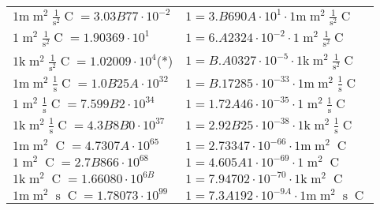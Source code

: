 \begin{center}
\begin{longtable}{l l}
{\color{gray}$1 \bm{\mathrm{ m}}{\operatorname{m}^2}\frac1{\operatorname{s}^2}{\operatorname{C}}{} = 3.03B77\cdot10^{-2} $}   & {\color{gray}$ 1 = 3.B690A\cdot10^{1} \cdot 1 \bm{\mathrm{ m}}{\operatorname{m}^2}\frac1{\operatorname{s}^2}{\operatorname{C}}{}$}  \\
{\color{black}$1 \bm{\mathrm{ }}{\operatorname{m}^2}\frac1{\operatorname{s}^2}{\operatorname{C}}{} = 1.90369\cdot10^{1} $}   & {\color{black}$ 1 = 6.A2324\cdot10^{-2} \cdot 1 \bm{\mathrm{ }}{\operatorname{m}^2}\frac1{\operatorname{s}^2}{\operatorname{C}}{}$}  \\
{\color{gray}$1 \bm{\mathrm{ k}}{\operatorname{m}^2}\frac1{\operatorname{s}^2}{\operatorname{C}}{} = 1.02009\cdot10^{4} $}\quad(*) & {\color{gray}$ 1 = B.A0327\cdot10^{-5} \cdot 1 \bm{\mathrm{ k}}{\operatorname{m}^2}\frac1{\operatorname{s}^2}{\operatorname{C}}{}$}  \\
{\color{gray}$1 \bm{\mathrm{ m}}{\operatorname{m}^2}\frac1{\operatorname{s}}{\operatorname{C}}{} = 1.0B25A\cdot10^{32} $}   & {\color{gray}$ 1 = B.17285\cdot10^{-33} \cdot 1 \bm{\mathrm{ m}}{\operatorname{m}^2}\frac1{\operatorname{s}}{\operatorname{C}}{}$}  \\
{\color{black}$1 \bm{\mathrm{ }}{\operatorname{m}^2}\frac1{\operatorname{s}}{\operatorname{C}}{} = 7.599B2\cdot10^{34} $}   & {\color{black}$ 1 = 1.72A46\cdot10^{-35} \cdot 1 \bm{\mathrm{ }}{\operatorname{m}^2}\frac1{\operatorname{s}}{\operatorname{C}}{}$}  \\
{\color{gray}$1 \bm{\mathrm{ k}}{\operatorname{m}^2}\frac1{\operatorname{s}}{\operatorname{C}}{} = 4.3B8B0\cdot10^{37} $}   & {\color{gray}$ 1 = 2.92B25\cdot10^{-38} \cdot 1 \bm{\mathrm{ k}}{\operatorname{m}^2}\frac1{\operatorname{s}}{\operatorname{C}}{}$}  \\
{\color{gray}$1 \bm{\mathrm{ m}}{\operatorname{m}^2}{}{\operatorname{C}}{} = 4.7307A\cdot10^{65} $}   & {\color{gray}$ 1 = 2.73347\cdot10^{-66} \cdot 1 \bm{\mathrm{ m}}{\operatorname{m}^2}{}{\operatorname{C}}{}$}  \\
{\color{black}$1 \bm{\mathrm{ }}{\operatorname{m}^2}{}{\operatorname{C}}{} = 2.7B866\cdot10^{68} $}   & {\color{black}$ 1 = 4.605A1\cdot10^{-69} \cdot 1 \bm{\mathrm{ }}{\operatorname{m}^2}{}{\operatorname{C}}{}$}  \\
{\color{gray}$1 \bm{\mathrm{ k}}{\operatorname{m}^2}{}{\operatorname{C}}{} = 1.66080\cdot10^{6B} $}   & {\color{gray}$ 1 = 7.94702\cdot10^{-70} \cdot 1 \bm{\mathrm{ k}}{\operatorname{m}^2}{}{\operatorname{C}}{}$}  \\
{\color{gray}$1 \bm{\mathrm{ m}}{\operatorname{m}^2}{\operatorname{s}}{\operatorname{C}}{} = 1.78073\cdot10^{99} $}   & {\color{gray}$ 1 = 7.3A192\cdot10^{-9A} \cdot 1 \bm{\mathrm{ m}}{\operatorname{m}^2}{\operatorname{s}}{\operatorname{C}}{}$}  \\

\end{longtable}
\end{center}

